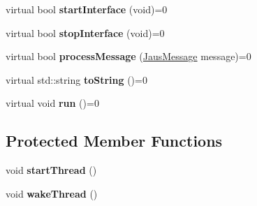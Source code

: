 \begin{DoxyCompactItemize}
\item 
\hypertarget{class_jaus_transport_interface_a90c956e0df0a4e8b22bc2edbd4c66977}{virtual bool {\bfseries start\-Interface} (void)=0}\label{class_jaus_transport_interface_a90c956e0df0a4e8b22bc2edbd4c66977}

\item 
\hypertarget{class_jaus_transport_interface_a24db48dc16801a32fc861ae29cdb8b66}{virtual bool {\bfseries stop\-Interface} (void)=0}\label{class_jaus_transport_interface_a24db48dc16801a32fc861ae29cdb8b66}

\item 
\hypertarget{class_jaus_transport_interface_a9c4b200e6a46c0a738a094c4f86a482c}{virtual bool {\bfseries process\-Message} (\hyperlink{struct_jaus_message_struct}{\-Jaus\-Message} message)=0}\label{class_jaus_transport_interface_a9c4b200e6a46c0a738a094c4f86a482c}

\item 
\hypertarget{class_jaus_transport_interface_a704ab6ae56ed1cc278b3eca16d75c3aa}{virtual std\-::string {\bfseries to\-String} ()=0}\label{class_jaus_transport_interface_a704ab6ae56ed1cc278b3eca16d75c3aa}

\item 
\hypertarget{class_jaus_transport_interface_a153e11084546bd37e9cbc18b1cf9409d}{virtual void {\bfseries run} ()=0}\label{class_jaus_transport_interface_a153e11084546bd37e9cbc18b1cf9409d}

\end{DoxyCompactItemize}
\subsection*{\-Protected \-Member \-Functions}
\begin{DoxyCompactItemize}
\item 
\hypertarget{class_jaus_transport_interface_a1f5293f045f9544dd978c09df196b939}{void {\bfseries start\-Thread} ()}\label{class_jaus_transport_interface_a1f5293f045f9544dd978c09df196b939}

\item 
\hypertarget{class_jaus_transport_interface_a4c5844a40471350b0cc2a450f700acd5}{void {\bfseries wake\-Thread} ()}\label{class_jaus_transport_interface_a4c5844a40471350b0cc2a450f700acd5}

\end{DoxyCompactItemize}
